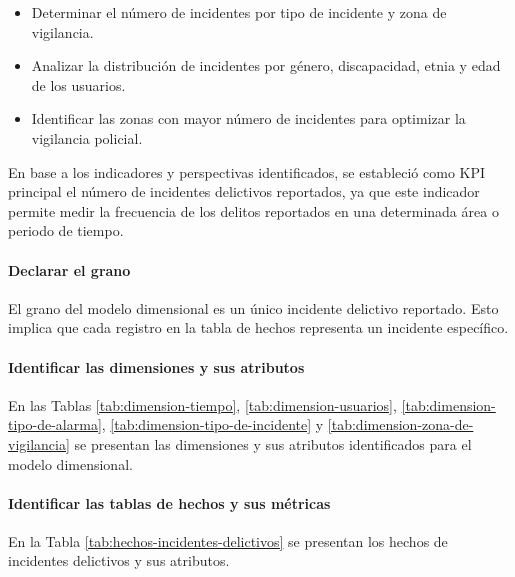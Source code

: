\begin{itemize}
    \item Determinar el número de incidentes por tipo de incidente y zona de vigilancia.
    \item Analizar la distribución de incidentes por género, discapacidad, etnia y edad de los usuarios.
    \item Identificar las zonas con mayor número de incidentes para optimizar la vigilancia policial.
\end{itemize}



En base a los indicadores y perspectivas identificados, se estableció como KPI principal el número de incidentes
delictivos reportados, ya que este indicador permite medir la frecuencia de los delitos reportados en una determinada
área o periodo de tiempo.

\paragraph{Declarar el grano}

El grano del modelo dimensional es un único incidente delictivo reportado. Esto implica que cada registro en la
tabla de hechos representa un incidente específico.

\paragraph{Identificar las dimensiones y sus atributos}

En las Tablas \ref{tab:dimension-tiempo}, \ref{tab:dimension-usuarios}, \ref{tab:dimension-tipo-de-alarma},
\ref{tab:dimension-tipo-de-incidente} y \ref{tab:dimension-zona-de-vigilancia} se presentan las dimensiones y
sus atributos identificados para el modelo dimensional.



\paragraph{Identificar las tablas de hechos y sus métricas}

En la Tabla \ref{tab:hechos-incidentes-delictivos} se presentan los hechos de incidentes delictivos y sus atributos.




